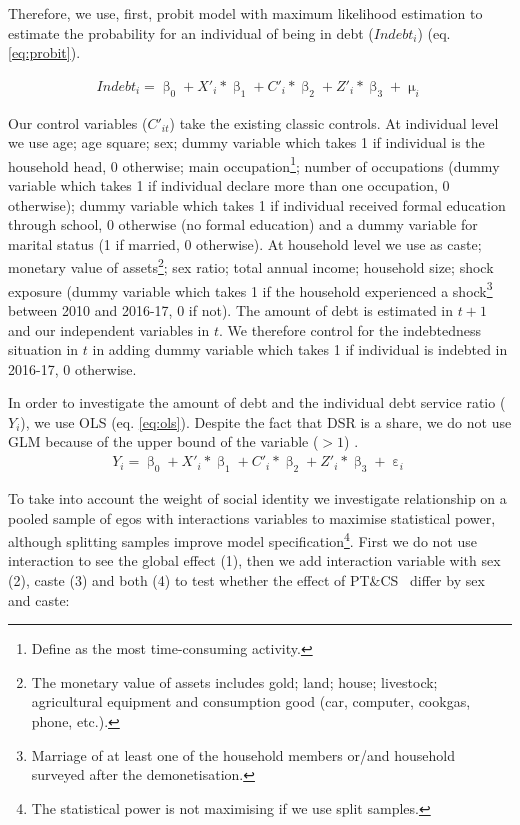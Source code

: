 \documentclass[a4paper, 12pt, onecolumn]{article}
\newcommand{\PTCS}{PT\&CS}
\begin{document}
Therefore, we use, first, probit model with maximum likelihood estimation to estimate the probability for an individual of being in debt ($Indebt_{i}$) (eq. \ref{eq:probit}).

\begin{equation}\label{eq:probit}
\begin{split}
Indebt_{i}=\upbeta_{0}+X'_{i}*\upbeta_{1}+C'_{i}*\upbeta_{2}+Z'_{i}*\upbeta_{3}+\upmu_{i}
\end{split}
\end{equation}

Our control variables ($C'_{it}$) take the existing classic controls.
At individual level we use age; age square; sex; dummy variable which takes 1 if individual is the household head, 0 otherwise; main occupation\footnote{Define as the most time-consuming activity.}; number of occupations (dummy variable which takes 1 if individual declare more than one occupation, 0 otherwise); dummy variable which takes 1 if individual received formal education through school, 0 otherwise (no formal education) and a dummy variable for marital status (1 if married, 0 otherwise). 
At household level we use as caste; monetary value of assets\footnote{The monetary value of assets includes gold; land; house; livestock; agricultural equipment and consumption good (car, computer, cookgas, phone, etc.).}; sex ratio; total annual income; household size; shock exposure (dummy variable which takes 1 if the household experienced a shock\footnote{Marriage of at least one of the household members or/and household surveyed after the demonetisation.} between 2010 and 2016-17, 0 if not). 
The amount of debt is estimated in $t+1$ and our independent variables in $t$.
We therefore control for the indebtedness situation in $t$ in adding dummy variable which takes 1 if individual is indebted in 2016-17, 0 otherwise.

In order to investigate the amount of debt and the individual debt service ratio ($Y_{i}$), we use OLS (eq. \ref{eq:ols}).
Despite the fact that DSR is a share, we do not use GLM because of the upper bound of the variable ($>1$) \citep{Cook2008}.
\begin{equation}\label{eq:ols}
\begin{split}
Y_{i}=\upbeta_{0}+X'_{i}*\upbeta_{1}+C'_{i}*\upbeta_{2}+Z'_{i}*\upbeta_{3}+\upepsilon_i
\end{split}
\end{equation}

To take into account the weight of social identity we investigate relationship on a pooled sample of egos with interactions variables to maximise statistical power, although splitting samples improve model specification\footnote{The statistical power is not maximising if we use split samples.}.
First we do not use interaction to see the global effect (1), then we add interaction variable with sex (2), caste (3) and both (4) to test whether the effect of \PTCS~ differ by sex and caste:
\end{document}
